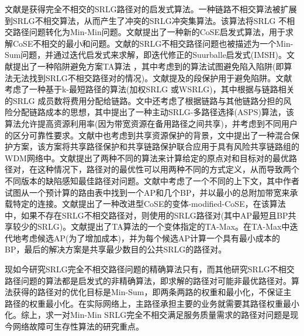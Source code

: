 文献是获得完全不相交的SRLG路径对的启发式算法。一种链路不相交算法被扩展到SRLG不相交算法\cite{rostami2007cose}，从而产生了冲突的SRLG冲突集算法。该算法将SRLG 不相交路径问题转化为Min-Min问题。文献提出了一种新的CoSE启发式算法，用于求解CoSE不相交的最小和问题。文献的SRLG不相交路径问题也被描述为一个Min-Sum问题，并通过迭代启发式来求解，即迭代修正的Suurballe启发式(IMSH)。文献提出了一种陷阱避免方案TA算法 ，其中考虑到的算法试图避免陷入陷阱(即算法无法找到SRLG不相交路径对的情况)。文献提及的段保护用于避免陷阱。文献考虑了一种基于k-最短路径的算法(加权SRLG 或WSRLG)，其中根据与链路相关的SRLG 成员数将费用分配给链路。文中还考虑了根据链路与其他链路分担的风险分配链路成本的思想，其中提出了一种主动SRLG-多路径选择(ASPS)算法，该算法允许提高资源利用率(因为带宽资源在备用路径之间共享)，并考虑到不同用户的区分可靠性要求。文献中也考虑到共享资源保护的背景，文中提出了一种混合保护方案，该方案将共享路径保护和共享链路保护联合应用于具有风险共享链路组的WDM网络中。文献提出了两种不同的算法来计算给定的原点对和目标对的最优路径对，在这种情况下，路径对的最优性可以用两种不同的方式定义，从而导致两个不同版本的缺陷感知最佳路径对问题。文献中考虑了一个不同的上下文，其中作者试图从一个预计算的路由表中找到一个AP和几个BP，并以最小的总附加带宽来承载特定的连接。文献提出了一种改进型CoSE的变体-modified-CoSE，在该算法中，如果不存在SRLG不相交路径对，则使用的SRLG路径对(其中AP最短且BP共享较少的SRLG)。文献提出了TA算法\cite{xu2003trap}的一个变体指定的TA-Max。在TA-Max中迭代地考虑候选AP(为了增加成本)，并为每个候选AP计算一个具有最小成本的BP，最后的解决方案是共享最少数目的公共SRLG的路径对。


现如今研究SRLG完全不相交路径问题的精确算法只有\cite{rostami2007cose,hu2003diverse,todimala2004imsh}，而其他研究SRLG不相交路径问题的算法\cite{xu2003trap}都是启发式的非精确算法，即求解的路径对可能非最优路径对。算法\cite{todimala2004imsh}获得的路径对的优化目标是Min-Sum，即两条两路的权重和最小化，不保证主路径的权重最小化。在实际网络上，主路径承担主要的业务就需要其路径权重最小化。综上，求一对Min-Min SRLG完全不相交满足服务质量需求的路径对问题是现今网络故障可生存性算法的研究重点。

